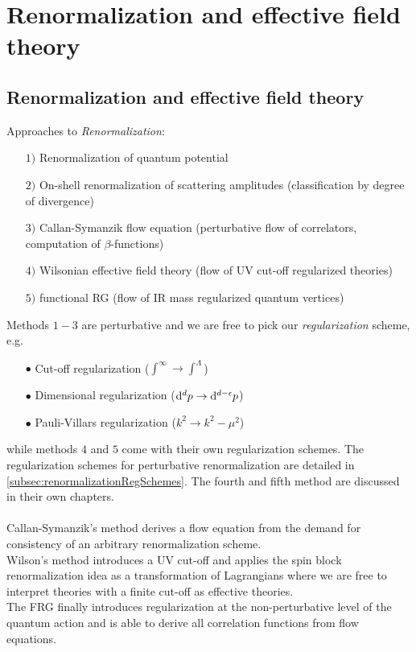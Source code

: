 \chapter{Renormalization and effective field theory}
\section{Renormalization and effective field theory}
\label{sec:renormalization}
Approaches to \emph{Renormalization}:
\begin{enumerate}
	\item[$1)$] Renormalization of quantum potential
	\item[$2)$] On-shell renormalization of scattering amplitudes (classification by degree of divergence)
	\item[$3)$] Callan-Symanzik flow equation (perturbative flow of correlators, computation of $\beta$-functions)
	\item[$4)$] Wilsonian effective field theory (flow of UV cut-off regularized theories)
	\item[$5)$]functional RG (flow of IR mass regularized quantum vertices)
\end{enumerate}
Methods $1-3$ are perturbative and we are free to pick our \emph{regularization} scheme, e.g.
\begin{enumerate}
\item[$\bullet$] Cut-off regularization ($\int^\infty \rightarrow \int^\Lambda$)
\item[$\bullet$] Dimensional regularization ($\mathrm{d}^d p \rightarrow \mathrm{d}^{d-\epsilon} p$)
\item[$\bullet$] Pauli-Villars regularization ($k^2\rightarrow k^2-\mu^2$)
\end{enumerate}
while methods $4$ and $5$ come with their own regularization schemes. The regularization schemes for perturbative renormalization are detailed in \ref{subsec:renormalizationRegSchemes}. The fourth and fifth method are discussed in their own chapters.\\
\\
Callan-Symanzik's method derives a flow equation from the demand for consistency of an arbitrary renormalization scheme.\\
Wilson's method introduces a UV cut-off and applies the spin block renormalization idea as a transformation of Lagrangians where we are free to interpret theories with a finite cut-off as effective theories.\\
The FRG finally introduces regularization at the non-perturbative level of the quantum action and is able to derive all correlation functions from flow equations.\\
